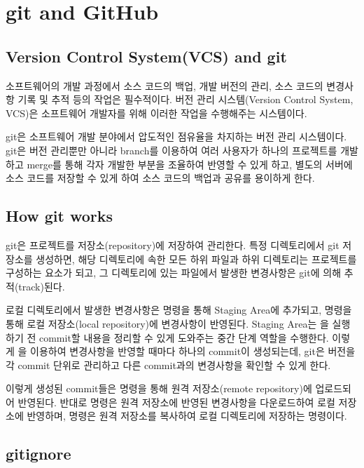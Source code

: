 \section{git and GitHub}\label{sect:git-and-github}

\subsection*{Version Control System(VCS) and git}

소프트웨어의 개발 과정에서 소스 코드의 백업, 개발 버전의 관리, 소스 코드의 변경사항 기록 및 추적 등의 작업은 필수적이다. 버전 관리 시스템(Version Control System, VCS)은 소프트웨어 개발자를 위해 이러한 작업을 수행해주는 시스템이다.

git은 소프트웨어 개발 분야에서 압도적인 점유율을 차지하는 버전 관리 시스템이다. git은 버전 관리뿐만 아니라 branch를 이용하여 여러 사용자가 하나의 프로젝트를 개발하고 merge를 통해 각자 개발한 부분을 조율하여 반영할 수 있게 하고, 별도의 서버에 소스 코드를 저장할 수 있게 하여 소스 코드의 백업과 공유를 용이하게 한다.

\subsection*{How git works}

git은 프로젝트를 저장소(repository)에 저장하여 관리한다. 특정 디렉토리에서 git 저장소를 생성하면, 해당 디렉토리에 속한 모든 하위 파일과 하위 디렉토리는 프로젝트를 구성하는 요소가 되고, 그 디렉토리에 있는 파일에서 발생한 변경사항은 git에 의해 추적(track)된다.

로컬 디렉토리에서 발생한 변경사항은  명령을 통해 Staging Area에 추가되고,  명령을 통해 로컬 저장소(local repository)에 변경사항이 반영된다. Staging Area는 을 실행하기 전 commit할 내용을 정리할 수 있게 도와주는 중간 단계 역할을 수행한다. 이렇게 을 이용하여 변경사항을 반영할 때마다 하나의 commit이 생성되는데, git은 버전을 각 commit 단위로 관리하고 다른 commit과의 변경사항을 확인할 수 있게 한다.

이렇게 생성된 commit들은  명령을 통해 원격 저장소(remote repository)에 업로드되어 반영된다. 반대로  명령은 원격 저장소에 반영된 변경사항을 다운로드하여 로컬 저장소에 반영하며,  명령은 원격 저장소를 복사하여 로컬 디렉토리에 저장하는 명령이다.


\subsection*{gitignore}

